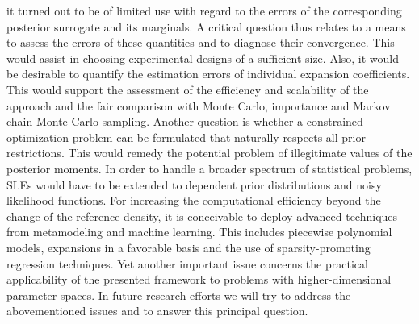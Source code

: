 it turned out to be of limited use with regard to the errors of the corresponding posterior surrogate and its marginals.
A critical question thus relates to a means to assess the errors of these quantities and to diagnose their convergence.
This would assist in choosing experimental designs of a sufficient size.
Also, it would be desirable to quantify the estimation errors of individual expansion coefficients.
This would support the assessment of the efficiency and scalability of the approach
and the fair comparison with Monte Carlo, importance and Markov chain Monte Carlo sampling.
Another question is whether a constrained optimization problem can be formulated that naturally respects all prior restrictions.
This would remedy the potential problem of illegitimate values of the posterior moments.
In order to handle a broader spectrum of statistical problems, SLEs would have to be extended to dependent prior distributions and noisy likelihood functions.
For increasing the computational efficiency beyond the change of the reference density, it is conceivable to deploy advanced techniques from metamodeling and machine learning.
This includes piecewise polynomial models, expansions in a favorable basis and the use of sparsity-promoting regression techniques.
Yet another important issue concerns the practical applicability of the presented framework to problems with higher-dimensional parameter spaces.
In future research efforts we will try to address the abovementioned issues and to answer this principal question.